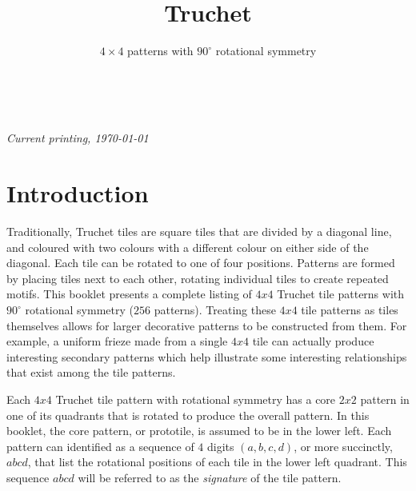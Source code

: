 \documentclass{tufte-book}
\title{Truchet}
\subtitle{$4\times4$ patterns with $90^{\circ}$ rotational symmetry}
\author[]{}
\begin{document}



\maketitle


\newpage
\begin{fullwidth}
~\vfill
\thispagestyle{empty}
\setlength{\parindent}{0pt}
\setlength{\parskip}{\baselineskip}



\par\textit{Current printing, \today}
\end{fullwidth}




\cleardoublepage



\chapter*{Introduction}

\noindent
Traditionally, Truchet tiles are square tiles that are divided by a diagonal line, and coloured with two colours with a different colour on either side of the diagonal. Each tile can be rotated to one of four positions. Patterns are formed by placing tiles next to each other, rotating individual tiles to create repeated motifs.
This booklet presents a complete listing of $4x4$ Truchet tile patterns with $90^{\circ}$ rotational symmetry ($256$ patterns). \marginnote{\centering} Treating these $4x4$ tile patterns as tiles themselves allows for larger decorative patterns to be constructed from them. For example, a uniform frieze made from a single $4x4$ tile can actually produce interesting secondary patterns which help illustrate some interesting relationships that exist among the tile patterns.  

\vspace{0.5cm}
\noindent
Each $4x4$
Truchet tile pattern with rotational symmetry has a core $2x2$ pattern in one of its quadrants that is rotated to produce the overall pattern. \marginnote{\centering} In this booklet, the core pattern, or prototile, is assumed to be in the lower left. Each pattern can identified as a sequence of $4$ digits $(a,b,c,d)$, or more succinctly, $abcd$, that list the rotational positions of each tile in the lower left quadrant. This sequence $abcd$ will be referred to as the \textit{signature} of the tile pattern.
\end{document}
